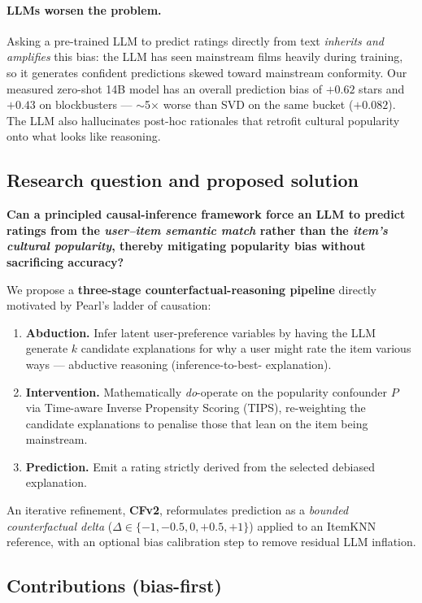 \documentclass[11pt,a4paper]{article}
\begin{document}
\paragraph{LLMs worsen the problem.} Asking a pre-trained LLM to predict
ratings directly from text \emph{inherits and amplifies} this bias: the
LLM has seen mainstream films heavily during training, so it generates
confident predictions skewed toward mainstream conformity. Our measured
zero-shot 14B model has an overall prediction bias of $+0.62$ stars and
$+0.43$ on blockbusters --- $\sim$5$\times$ worse than SVD on the same bucket ($+0.082$).
The LLM also hallucinates post-hoc rationales that retrofit cultural
popularity onto what looks like reasoning.

\subsection{Research question and proposed solution}

\textbf{Can a principled causal-inference framework force an LLM to
predict ratings from the \emph{user--item semantic match} rather than
the \emph{item's cultural popularity}, thereby mitigating popularity
bias without sacrificing accuracy?}

We propose a \textbf{three-stage counterfactual-reasoning pipeline}
directly motivated by Pearl's ladder of causation:
\begin{enumerate}[leftmargin=1.8em,itemsep=2pt]
\item \textbf{Abduction.} Infer latent user-preference variables by having
      the LLM generate $k$ candidate explanations for why a user might rate
      the item various ways --- abductive reasoning (inference-to-best-
      explanation).
\item \textbf{Intervention.} Mathematically \emph{do}-operate on the
      popularity confounder $P$ via Time-aware Inverse Propensity Scoring
      (TIPS), re-weighting the candidate explanations to penalise those
      that lean on the item being mainstream.
\item \textbf{Prediction.} Emit a rating strictly derived from the
      selected debiased explanation.
\end{enumerate}
An iterative refinement, \textbf{CFv2}, reformulates prediction as a
\emph{bounded counterfactual delta} ($\Delta \in \{-1, -0.5, 0, +0.5, +1\}$)
applied to an ItemKNN reference, with an optional bias calibration step to
remove residual LLM inflation.

\subsection{Contributions (bias-first)}
\end{document}
